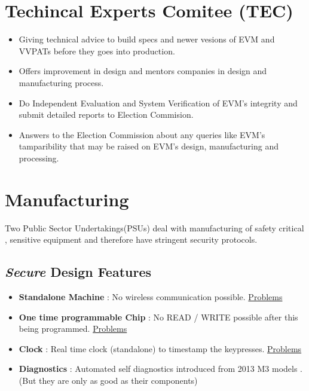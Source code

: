 \documentclass[12pt]{report}
\begin{document}
\section{Techincal Experts Comitee (TEC)}
\begin{itemize}
  \item Giving technical advice to build specs and newer vesions of EVM and VVPATs  before they goes into production.
  \item Offers improvement in design and mentors companies in design and manufacturing process.
  \item Do Independent Evaluation and System Verification of EVM's integrity and submit detailed reports to Election Commision.
  \item Answers to the Election Commission about any queries like EVM's tamparibility that may be raised on EVM's design, manufacturing and processing.
\end{itemize}

\section{Manufacturing}
Two Public Sector Undertakings(PSUs) deal with manufacturing of safety critical , sensitive equipment and therefore have stringent security protocols.
\subsection{\textit{Secure} Design Features}
\begin{itemize}
  \item \textbf{Standalone Machine} : No wireless communication possible. \hyperref[sec:standalone]{Problems}
  \item \textbf{One time programmable Chip} : No READ / WRITE possible after this being programmed. \hyperref[sec:otp]{Problems}
  \item \textbf{Clock} : Real time clock (standalone) to timestamp the keypresses. \hyperref[sec:clock]{Problems}
  \item \textbf{Diagnostics} : Automated self diagnostics introduced from 2013 M3 models . (But they are only as good as their components)
\end{itemize}
\end{document}
